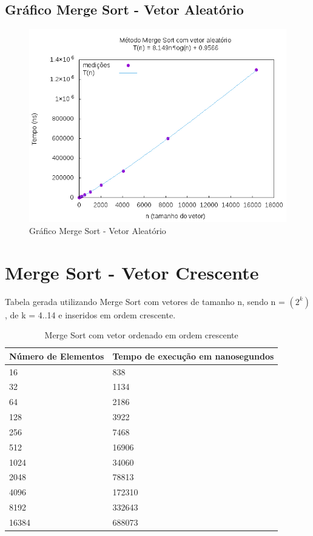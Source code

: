 \documentclass[12pt,a4paper,twoside]{report}
\begin{document}
\subsection{Gráfico Merge Sort - Vetor Aleatório}
\begin{figure}[H]
    \centering
    \includegraphics[width=0.7\linewidth]{graficos/MergeSort/vIntAleatorio/vIntAleatorio.png}
  \caption{Gráfico Merge Sort - Vetor Aleatório}
\end{figure}

\section{Merge Sort - Vetor Crescente}
Tabela gerada utilizando Merge Sort com vetores de tamanho n, sendo n = $(2^k)$, de k = 4..14 e inseridos em ordem crescente.
\begin{table}[H]
\centering
\caption{Merge Sort com vetor ordenado em ordem crescente}
\label{my-label}
\begin{tabular}{|l|l|}
\hline
\multicolumn{1}{|c|}{\textbf{Número de Elementos}} & \multicolumn{1}{c|}{\textbf{Tempo de execução em nanosegundos}} \\ \hline
16 & 838 \\ \hline
32 & 1134 \\ \hline
64 & 2186 \\ \hline
128 & 3922 \\ \hline
256 & 7468 \\ \hline
512 & 16906 \\ \hline
1024 & 34060 \\ \hline
2048 & 78813 \\ \hline
4096 & 172310 \\ \hline
8192 & 332643 \\ \hline
16384 & 688073 \\ \hline
\end{tabular}
\end{table}
\end{document}
